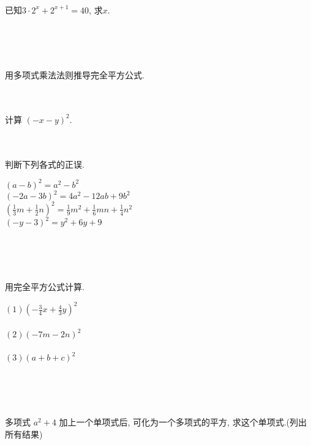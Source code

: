 \\ \\ \\
\item{
    已知$3\cdot2^x + 2^{x+1}=40$, 求$x$.
        \iffalse
        \fangsong\zihao{4}
        思路: 将左边的2个$2^{x}$整理到一起.
    
        解答: 
        \begin{align*}
            3\cdot2^x + 2^{x+1} &= 40\\
            3\cdot2^x + 2\cdot 2^{x} &= 40\\
            5\cdot2^x &= 40\\
            2^x &= 8\\
            \therefore x = 3.
        \end{align*}
        \fi
}
\\ \\ \\
\item{
    用多项式乘法法则推导完全平方公式.
}
\\ \\ \\
\item{
    计算 $(-x-y)^2$.
}
\\ \\ \\
\item{
    判断下列各式的正误.

    $(a-b)^2 = a^2 - b^2$\\
    $(-2a-3b)^2 = 4a^2 - 12ab +9b^2$\\
    $(\frac13 m + \frac12 n)^2 = \frac19 m^2 + \frac16 mn + \frac14 n^2$\\
    $(-y-3)^2 = y^2 + 6y + 9$
}
\\ \\ \\
\item{
    用完全平方公式计算.

    $(1) (-\frac34 x + \frac43 y)^2$ \\ \\

    $(2) (-7m-2n)^2$ \\ \\
    
    $(3) (a+b+c)^2$ \\ \\
}
\\ \\

\item{
    多项式 $a^2 + 4$ 加上一个单项式后, 可化为一个多项式的平方, 求这个单项式.(列出所有结果)
}
\\ \\ \\

